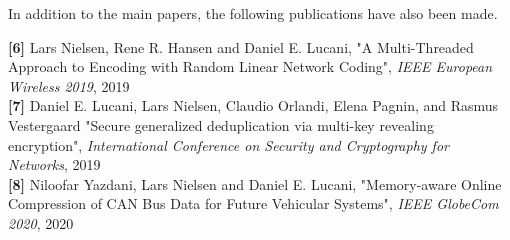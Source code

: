 \null\clearpage

In addition to the main papers, the following publications have also been
made.

\textbf{[6]} Lars Nielsen, Rene R. Hansen and Daniel E. Lucani, 
"A Multi-Threaded Approach to Encoding with Random Linear Network Coding",
\emph{IEEE European Wireless 2019},
2019 \\

\textbf{[7]} Daniel E. Lucani, Lars Nielsen, Claudio Orlandi, Elena Pagnin, and Rasmus Vestergaard
"Secure generalized deduplication via multi-key revealing encryption",
\emph{International Conference on Security and Cryptography for Networks},
2019 \\

\textbf{[8]} Niloofar Yazdani, Lars Nielsen and Daniel E. Lucani,
"Memory-aware Online Compression of CAN Bus Data for Future Vehicular Systems",
\emph{IEEE GlobeCom 2020},
2020 \\


